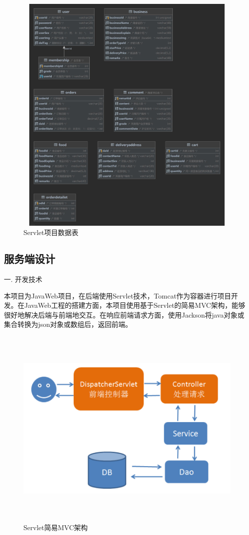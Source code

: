 \begin{figure}[H]
    \centering
    \includegraphics[width=15cm,height=12cm]{figures/table2.jpg}
    \caption{Servlet项目数据表}
\end{figure}

\subsection{服务端设计}
\noindent
一. 开发技术

本项目为JavaWeb项目，在后端使用Servlet技术，Tomcat作为容器进行项目开发。在JavaWeb工程的搭建方面，本项目使用基于Servlet的简易MVC架构，能够很好地解决后端与前端地交互。在响应前端请求方面，使用Jackson将java对象或集合转换为json对象或数组后，返回前端。

\begin{figure}[H]
    \centering
    \includegraphics[width=15cm,height=10cm]{figures/MVC.png}
    \caption{Servlet简易MVC架构}
\end{figure}

